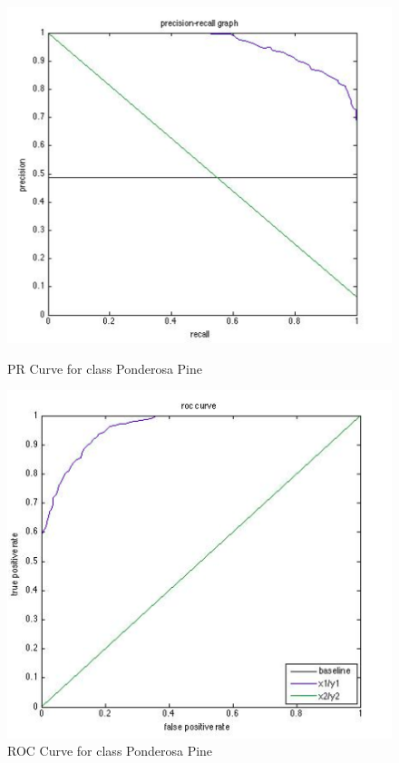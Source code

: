\documentclass[11pt]{article}
\begin{document}
\begin{figure}[htbp]
\begin{minipage}[b]{0.5\linewidth}
\centering
\includegraphics[width=\linewidth]{PonderosaPinePRCurve.png}
\caption{PR Curve for class Ponderosa Pine}
\label{fig:chapter001_dist_001}
\end{minipage}
\hspace{0.5cm}
\begin{minipage}[b]{0.5\linewidth}
\centering
\includegraphics[width=\linewidth]{PonderosaPineROCCurve.png}
\caption{ROC Curve for class Ponderosa Pine}
\label{fig:chapter001_reward_001}
\end{minipage}
\end{figure}
\end{document}
